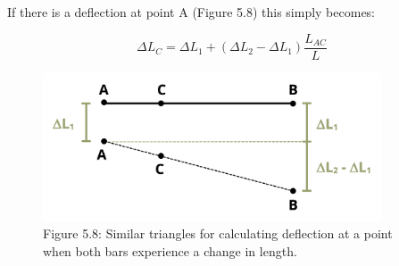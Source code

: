 \documentclass[
  letterpaper,
  DIV=11,
  numbers=noendperiod]{scrreprt}
\theoremstyle{definition}
\theoremstyle{remark}
\begin{document}
If there is a deflection at point A (Figure 5.8) this simply becomes:

\[
\Delta L_C=\Delta L_1+\left(\Delta L_2-\Delta L_1\right) \frac{L_{A C}}{L}\]

\begin{figure}[H]

{\centering \includegraphics[width=3.94792in,height=\textheight]{images/PNGs/Figure 5.9.png}

}

\caption{Figure 5.8: Similar triangles for calculating deflection at a
point when both bars experience a change in length.}

\end{figure}%
\end{document}
